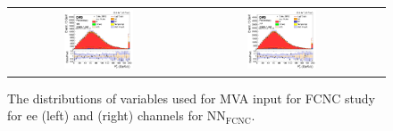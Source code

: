 \begin{figure}[ht]
  \begin{center}
    \begin{tabular}{ccc}
      \includegraphics[width=0.4\textwidth]{figures/tW/fig/FCNC_MVA_input/ee/H_BSM_xj1b_Ptll.png}&
      \includegraphics[width=0.4\textwidth]{figures/tW/fig/FCNC_MVA_input/mumu/H_BSM_xj1b_Ptll.png}\\
    \end{tabular}
    \caption{The distributions of variables used for MVA input for FCNC study for ee (left) and \mumu (right) channels for NN$_{\text{FCNC}}$.
    \label{fig:MVA_FCNC_1j1t_1}}
  \end{center}
\end{figure}

